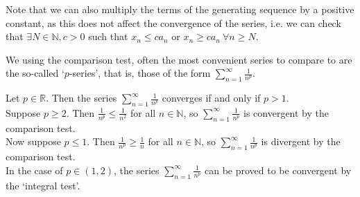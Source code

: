 \documentclass[../real_analysis.tex]{subfiles}
\begin{document}
        Note that we can also multiply the terms of the generating sequence by a positive constant, as this does not affect the convergence of the series, i.e. we can check that $\exists N\in\mathbb{N}, c>0$ such that $x_n\leq ca_n$ or $x_n\geq ca_n\ \forall n\geq N$.

        We using the comparison test, often the most convenient series to compare to are the so-called `$p$-series', that is, those of the form $\sum_{n=1}^\infty\frac{1}{n^p}$.
        \begin{example}
            Let $p\in\mathbb{R}$. Then the series $\sum_{n=1}^\infty\frac{1}{n^p}$ converges if and only if $p>1$.\\
            Suppose $p\geq2$. Then $\frac{1}{n^p}\leq\frac{1}{n^2}$ for all $n\in\mathbb{N}$, so $\sum_{n=1}^\infty\frac{1}{n^p}$ is convergent by the comparison test.\\
            Now suppose $p\leq1$. Then $\frac{1}{n^p}\geq\frac{1}{n}$ for all $n\in\mathbb{N}$, so $\sum_{n=1}^\infty\frac{1}{n^p}$ is divergent by the comparison test.\\
            In the case of $p\in(1, 2)$, the series $\sum_{n=1}^\infty\frac{1}{n^p}$ can be proved to be convergent by the `integral test'.
        \end{example}
\end{document}
